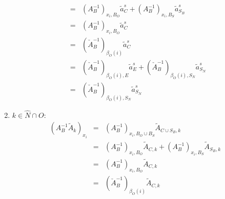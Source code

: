 \documentclass[a4paper]{article}
\begin{document}
\begin{enumerate}
\begin{eqnarray}
  &=&
  (A_{B}^{-1})_{x_{i}, B_{O}}\tilde{a}_{C}^{s} +
  (A_{B}^{-1})_{x_{i}, B_{S}}\tilde{a}_{S_{B}}^{s} 
  \nonumber \\
  &=&
  (A_{B}^{-1})_{x_{i}, B_{O}}\tilde{a}_{C}^{s}
  \nonumber \\
  &=&
  \left(\check{A}_{B}^{-1}\right)_{\beta_{O}(i)}\tilde{a}_{C}^{s} 
  \nonumber \\
  &=&
  \left(\check{A}_{B}^{-1}\right)_{\beta_{O}(i), E}\tilde{a}_{E}^{s}
  +\left(\check{A}_{B}^{-1}\right)_{\beta_{O}(i), S_{N}}\tilde{a}_{S_{N}}^{s}
  \nonumber \\
  &=&
  \left(\check{A}_{B}^{-1}\right)_{\beta_{O}(i), S_{N}}\tilde{a}_{S_N}^{s}
\end{eqnarray}
\item $k \in \hat{N} \cap O$:
\begin{eqnarray}
  (A_{B}^{-1}\tilde{A}_{k})_{x_{i}} &=&
  (A_{B}^{-1})_{x_{i}, B_{O} \cup B_{S}}\tilde{A}_{C \cup S_{B}, k}
  \nonumber \\
  &=&
  (A_{B}^{-1})_{x_{i}, B_{O}}\tilde{A}_{C, k} +
  (A_{B}^{-1})_{x_{i}, B_{S}}\tilde{A}_{S_{B}, k}
  \nonumber \\
  &=&
  (A_{B}^{-1})_{x_{i}, B_{O}}\tilde{A}_{C, k}
  \nonumber \\  
  &=&
  \left(\check{A}_{B}^{-1}\right)_{\beta_{O}(i)}\tilde{A}_{C,k} 
\end{eqnarray}
\end{enumerate}
\end{document}
